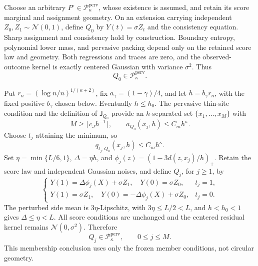 Choose an arbitrary \(P^\circ\in\mathcal P_{\kappa}^{\mathrm{perv}}\),
whose existence is assumed, and retain its score marginal and assignment
geometry.  On an extension carrying independent
\(Z_0,Z_1\sim\mathcal N(0,1)\), define \(Q_0\) by
\(Y(t)=\sigma Z_t\) and the consistency equation.  Sharp assignment and
consistency hold by construction.  Boundary entropy, polynomial lower
mass, and pervasive packing depend only on the retained score law and
geometry.  Both regressions and traces are zero, and the observed-outcome
kernel is exactly centered Gaussian with variance \(\sigma^2\).  Thus
\[
 Q_0\in\mathcal P_{\kappa}^{\mathrm{perv}}.
 \tag{77}
\]

Put \(r_n=(\log n/n)^{1/(\kappa+2)}\), fix
\(a_\gamma=(1-\gamma)/4\), and let \(h=b_\gamma r_n\), with the fixed
positive \(b_\gamma\) chosen below.  Eventually \(h\le h_0\).  The
pervasive thin-site condition and the definition of \(\mathsf J_{Q_0}\)
provide an \(h\)-separated set \(\{x_1,\ldots,x_M\}\) with
\[
 M\ge\lfloor c_Jh^{-1}\rfloor,
 \qquad a_{Q_0}(x_j,h)\le C_mh^\kappa.
 \tag{78}
\]
Choose \(t_j\) attaining the minimum, so
\[
 q_{t_j,Q_0}(x_j,h)\le C_mh^\kappa.
 \tag{79}
\]
Set \(\eta=\min\{L/6,1\}\), \(\Delta=\eta h\), and
\(\phi_j(z)=(1-3d(z,x_j)/h)_+\).  Retain the score law and independent
Gaussian noises, and define \(Q_j\), for \(j\ge1\), by
\[
 \begin{cases}
 Y(1)=\Delta\phi_j(X)+\sigma Z_1,\quad Y(0)=\sigma Z_0,&t_j=1,\\
 Y(1)=\sigma Z_1,\quad Y(0)=-\Delta\phi_j(X)+\sigma Z_0,&t_j=0.
 \end{cases}
 \tag{80}
\]
The perturbed side mean is \(3\eta\)-Lipschitz, with
\(3\eta\le L/2<L\), and \(h<h_0<1\) gives
\(\Delta\le\eta<L\).  All score conditions are unchanged and the
centered residual kernel remains \(\mathcal N(0,\sigma^2)\).  Therefore
\[
 Q_j\in\mathcal P_{\kappa}^{\mathrm{perv}},
 \qquad 0\le j\le M.
 \tag{81}
\]
This membership conclusion uses only the frozen member conditions, not
circular geometry.

